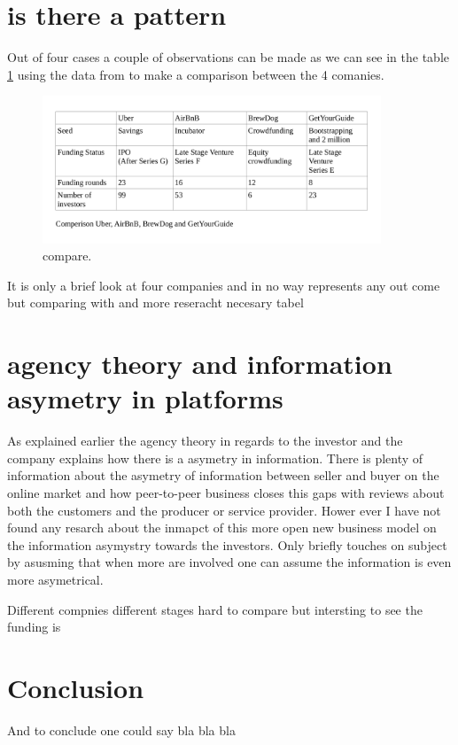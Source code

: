 \documentclass[a4paper, 11pt]{article}
\begin{document}
\section{is there a pattern}

Out of four cases a couple of observations can be made as we can see in the table  \ref{fig:graph2} using the data from \citep{crunch} to make a comparison between the 4 comanies.


\begin{figure}[h!]
    \centering
    \includegraphics[width=0.9\textwidth]{table.png}
    \caption{compare.}
    \label{fig:graph2}
\end{figure}




It is only a brief look at four companies and in no way represents any out come but comparing with and more reseracht necesary
tabel


\section{agency theory and information asymetry in platforms}
As explained earlier the agency theory in regards to the investor and the company explains how there is a asymetry in information. There is plenty of information about the asymetry of information between seller and buyer on the online market and how peer-to-peer business closes this gaps with reviews about both the customers and the producer or service provider. Hower ever I have not found any resarch about the inmapct of this more open new business model on the information asymystry towards the investors. Only  \cite{colombo2016open} briefly touches on subject by asusming that when more are involved one can assume the information is even more asymetrical. 




Different compnies different stages hard to compare but intersting to see the funding is 




\section{Conclusion}

And to conclude one could say bla bla bla


\renewcommand{\textbf}{}
\renewcommand{\bf}{}
{}
\end{document}
